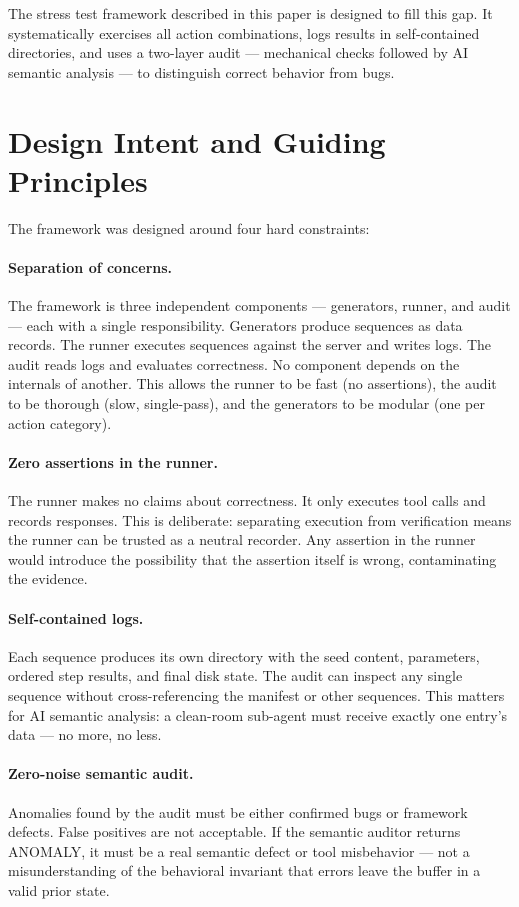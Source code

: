 \documentclass{article}
\begin{document}
The stress test framework described in this paper is designed to fill this gap.
It systematically exercises all action combinations, logs results in
self-contained directories, and uses a two-layer audit --- mechanical checks
followed by AI semantic analysis --- to distinguish correct behavior from bugs.

\section{Design Intent and Guiding Principles}
\label{sec:intent}

The framework was designed around four hard constraints:

\paragraph{Separation of concerns.} The framework is three independent components
--- generators, runner, and audit --- each with a single responsibility.
Generators produce sequences as data records. The runner executes sequences
against the server and writes logs. The audit reads logs and evaluates
correctness. No component depends on the internals of another. This allows the
runner to be fast (no assertions), the audit to be thorough (slow, single-pass),
and the generators to be modular (one per action category).

\paragraph{Zero assertions in the runner.} The runner makes no claims about
correctness. It only executes tool calls and records responses. This is
deliberate: separating execution from verification means the runner can be
trusted as a neutral recorder. Any assertion in the runner would introduce the
possibility that the assertion itself is wrong, contaminating the evidence.

\paragraph{Self-contained logs.} Each sequence produces its own directory with
the seed content, parameters, ordered step results, and final disk state.
The audit can inspect any single sequence without cross-referencing the
manifest or other sequences. This matters for AI semantic analysis: a
clean-room sub-agent must receive exactly one entry's data --- no more, no less.

\paragraph{Zero-noise semantic audit.} Anomalies found by the audit must be
either confirmed bugs or framework defects. False positives are not acceptable.
If the semantic auditor returns ANOMALY, it must be a real semantic defect or
tool misbehavior --- not a misunderstanding of the behavioral invariant that
errors leave the buffer in a valid prior state.
\end{document}
